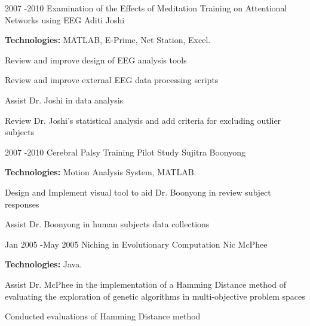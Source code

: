 \documentclass[10pt]{article} %
\begin{document}
\project
{2007 -}{2010}
{ Examination of the Effects of Meditation Training on Attentional Networks using EEG}
{Aditi Joshi}
{\rule{0mm}{5mm}\textbf{Technologies:} MATLAB, E-Prime, Net Station, Excel.

\begin{itemize-noindent}
\setlength\itemsep{0.12em}
\item{Review and improve design of EEG analysis tools}
\item{Review and improve external EEG data processing scripts}
\item{Assist Dr. Joshi in data analysis}
\item{Review Dr. Joshi's statistical analysis and add criteria for excluding outlier subjects}
\end{itemize-noindent}

}


\project
{2007 -}{2010}
{Cerebral Palsy Training Pilot Study}
{Sujitra Boonyong}
{\rule{0mm}{5mm}\textbf{Technologies:} Motion Analysis System, MATLAB.

\begin{itemize-noindent}
\setlength\itemsep{0.12em}
\item{Design and Implement visual tool to aid Dr. Boonyong in review subject responses}
\item{Assist Dr. Boonyong in human subjects data collections}
\end{itemize-noindent}

}


\project
{Jan 2005 -}{May 2005}
{Niching in Evolutionary Computation}
{Nic McPhee}
{\rule{0mm}{5mm}\textbf{Technologies:} Java.

\begin{itemize-noindent}
\setlength\itemsep{0.12em}
\item{Assist Dr. McPhee in the implementation of a Hamming Distance method of evaluating the exploration of genetic algorithms in multi-objective problem spaces}
\item{Conducted evaluations of Hamming Distance method}
\end{itemize-noindent}

}

\end{document}
